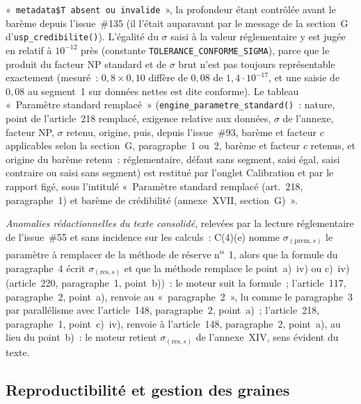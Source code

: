 \documentclass[a4paper,11pt]{article}
\newcommand{\code}[1]{\texttt{\small #1}}
\begin{document}
\begin{encadre}
«~\code{metadata\$T absent ou invalide}~», la profondeur étant contrôlée avant le barème depuis
l'issue~\#135 (il l'était auparavant par le message de la section~G d'\code{usp\_credibilite()}). L'égalité du $\sigma$ saisi à la valeur réglementaire y est
jugée en relatif à $10^{-12}$ près (constante \code{TOLERANCE\_CONFORME\_SIGMA}), parce que le
produit du facteur NP standard et de $\sigma$ brut n'est pas toujours représentable exactement
(mesuré~: $0{,}8 \times 0{,}10$ diffère de $0{,}08$ de $1{,}4\cdot 10^{-17}$, et une saisie de
$0{,}08$ au segment~1 sur données nettes est dite conforme). Le tableau «~Paramètre standard
remplacé~» (\code{engine\_parametre\_standard()}~: nature, point de l'article~218 remplacé,
exigence relative aux données, $\sigma$ de l'annexe, facteur NP, $\sigma$ retenu, origine, puis,
depuis l'issue~\#93, barème et facteur $c$ applicables selon la section~G, paragraphe~1 ou~2,
barème et facteur $c$ retenus, et origine du barème retenu~: réglementaire, défaut sans segment,
saisi égal, saisi contraire ou saisi sans segment) est restitué par l'onglet Calibration et par
le rapport figé, sous l'intitulé «~Paramètre standard remplacé (art.~218, paragraphe~1) et
barème de crédibilité (annexe~XVII, section~G)~».

\smallskip
\emph{Anomalies rédactionnelles du texte consolidé}, relevées par la lecture réglementaire de
l'issue~\#55 et sans incidence sur les calculs~: C(4)(e) nomme $\sigma_{(\text{prem},s)}$ le
paramètre à remplacer de la méthode de réserve n\textsuperscript{o}~1, alors que la formule du
paragraphe~4 écrit $\sigma_{(\text{res},s)}$ et que la méthode remplace le point~a)~iv) ou c)~iv)
(article~220, paragraphe~1, point~b))~:
le moteur suit la formule~; l'article~117, paragraphe~2, point~a), renvoie au «~paragraphe~2~»,
lu comme le paragraphe~3 par parallélisme avec l'article~148, paragraphe~2, point~a)~;
l'article~218, paragraphe~1, point~c)~iv), renvoie à l'article~148, paragraphe~2, point~a), au
lieu du point~b)~: le moteur retient $\sigma_{(\text{res},s)}$ de l'annexe~XIV, sens évident du
texte.
\end{encadre}

\subsection{Reproductibilité et gestion des graines}
\label{sec:graines}
\end{document}
